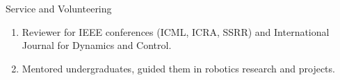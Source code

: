 \documentclass{resume}
\newcommand{\resumeHeadingListStart}{
  \begin{itemize}[leftmargin=0.15in, label={}]
    
}
\begin{document}
\begin{rSection}{Service and Volunteering}
 
\begin{enumerate}
    \item Reviewer for IEEE conferences (ICML, ICRA, SSRR) and International Journal for Dynamics and Control.
    \item Mentored undergraduates, guided them in robotics research and projects.
\end{enumerate}
\end{rSection}



\end{document}
